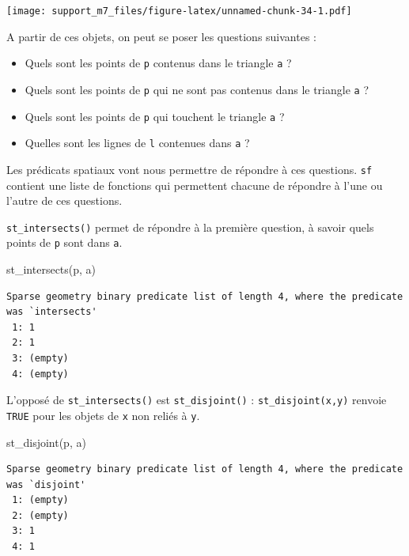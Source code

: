 \documentclass[
]{book}
\newenvironment{Shaded}{\begin{snugshade}}{\end{snugshade}}
\newcommand{\FunctionTok}[1]{\textcolor[rgb]{0.00,0.00,0.00}{#1}}
\newcommand{\NormalTok}[1]{#1}
\begin{document}
\texttt{[image: support\_m7\_files/figure-latex/unnamed-chunk-34-1.pdf]}

A partir de ces objets, on peut se poser les questions suivantes :

\begin{itemize}
\item
  Quels sont les points de \texttt{p} contenus dans le triangle \texttt{a} ?
\item
  Quels sont les points de \texttt{p} qui ne sont pas contenus dans le triangle \texttt{a} ?
\item
  Quels sont les points de \texttt{p} qui touchent le triangle \texttt{a} ?
\item
  Quelles sont les lignes de \texttt{l} contenues dans \texttt{a} ?
\end{itemize}

Les prédicats spatiaux vont nous permettre de répondre à ces questions. \texttt{sf} contient une liste de fonctions qui permettent chacune de répondre à l'une ou l'autre de ces questions.

\texttt{st\_intersects()} permet de répondre à la première question, à savoir quels points de \texttt{p} sont dans \texttt{a}.

\begin{Shaded}
\begin{Highlighting}[]
\FunctionTok{st\_intersects}\NormalTok{(p, a)}
\end{Highlighting}
\end{Shaded}

\begin{verbatim}
Sparse geometry binary predicate list of length 4, where the predicate
was `intersects'
 1: 1
 2: 1
 3: (empty)
 4: (empty)
\end{verbatim}

L'opposé de \texttt{st\_intersects()} est \texttt{st\_disjoint()} : \texttt{st\_disjoint(x,y)} renvoie \texttt{TRUE} pour les objets de \texttt{x} non reliés à \texttt{y}.

\begin{Shaded}
\begin{Highlighting}[]
\FunctionTok{st\_disjoint}\NormalTok{(p, a)}
\end{Highlighting}
\end{Shaded}

\begin{verbatim}
Sparse geometry binary predicate list of length 4, where the predicate
was `disjoint'
 1: (empty)
 2: (empty)
 3: 1
 4: 1
\end{verbatim}
\end{document}
